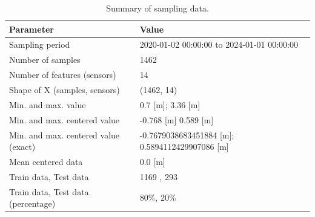 \begin{table}[htbp]
\centering
\caption{Summary of sampling data.}
\label{tab:sampling_data}
\begin{tabular}{|l|l|}
\hline
\textbf{Parameter}                           & \textbf{Value}                                \\ \hline
Sampling period                              & 2020-01-02 00:00:00 to 2024-01-01 00:00:00   \\ \hline
Number of samples                            & 1462                                          \\ \hline
Number of features (sensors)                 & 14                                            \\ \hline
Shape of X (samples, sensors)                & (1462, 14)                                    \\ \hline
Min. and max. value                          & 0.7 [m]; 3.36 [m] \\ \hline
Min. and max. centered value                 & -0.768 [m] 0.589 [m]                         \\ \hline
Min. and max. centered value (exact)         & -0.7679038683451884 [m]; 0.5894112429907086 [m] \\ \hline
Mean centered data                           & 0.0 [m]                                     \\ \hline
Train data, Test data                        & 1169 , 293                                   \\ \hline
Train data, Test data (percentage)           & 80\%, 20\%                                  \\ \hline
\end{tabular}
\end{table} 

